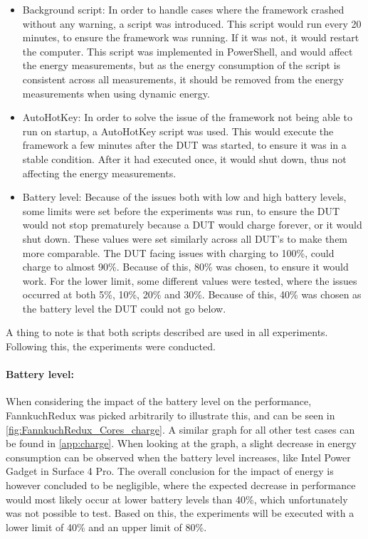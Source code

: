 \begin{itemize}
    \item Background script: In order to handle cases where the framework crashed without any warning, a script was introduced. This script would run every 20 minutes, to ensure the framework was running. If it was not, it would restart the computer. This script was implemented in PowerShell, and would affect the energy measurements, but as the energy consumption of the script is consistent across all measurements, it should be removed from the energy measurements when using dynamic energy.
    \item AutoHotKey: In order to solve the issue of the framework not being able to run on startup, a AutoHotKey script was used. This would execute the framework a few minutes after the DUT was started, to ensure it was in a stable condition. After it had executed once, it would shut down, thus not affecting the energy measurements.
    \item Battery level: Because of the issues both with low and high battery levels, some limits were set before the experiments was run, to ensure the DUT would not stop prematurely because a DUT would charge forever, or it would shut down. These values were set similarly across all DUT's to make them more comparable. The DUT facing issues with charging to 100\%, could charge to almost 90\%. Because of this, 80\% was chosen, to ensure it would work. For the lower limit, some different values were tested, where the issues occurred at both 5\%, 10\%, 20\% and 30\%. Because of this, 40\% was chosen as the battery level the DUT could not go below.
\end{itemize}

A thing to note is that both scripts described are used in all experiments. Following this, the experiments were conducted.



\paragraph{Battery level:} When considering the impact of the battery level on the performance, FannkuchRedux was picked arbitrarily to illustrate this, and can be seen in \cref{fig:FannkuchRedux_Cores_charge}. A similar graph for all other test cases can be found in \cref{app:charge}. When looking at the graph, a slight decrease in energy consumption can be observed when the battery level increases, like Intel Power Gadget in Surface 4 Pro. The overall conclusion for the impact of energy is however concluded to be negligible, where the expected decrease in performance would most likely occur at lower battery levels than 40\%, which unfortunately was not possible to test. Based on this, the experiments will be executed with a lower limit of 40\% and an upper limit of 80\%.

